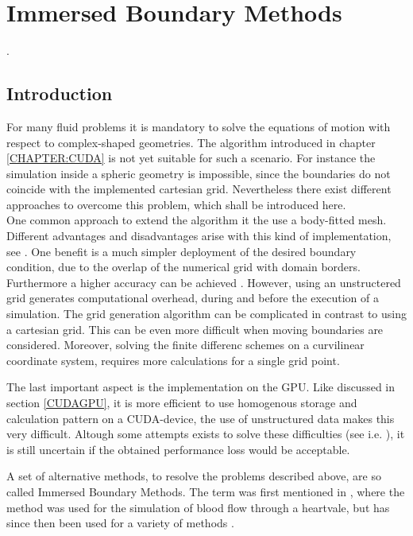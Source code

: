 \chapter{Immersed Boundary Methods}
\label{CHAPTER:IBM}.

\section{Introduction}

For many fluid problems it is mandatory to solve the equations of motion with respect to complex-shaped geometries.
The algorithm introduced in chapter \ref{CHAPTER:CUDA} is not yet suitable for such a scenario.
For instance the simulation inside a spheric geometry is impossible, since the boundaries
do not coincide with the implemented cartesian grid. Nevertheless there exist different approaches to overcome this problem,
which shall be introduced here. \\
One common approach to extend the algorithm it the use a body-fitted mesh.
Different advantages and disadvantages arise with this kind of implementation, see \citep{Mittal2005}.
One benefit is a much simpler deployment of the desired boundary condition, due to the overlap of the numerical grid with domain borders.
Furthermore a higher accuracy can be achieved \citep{Gornak2013}.
However, using an unstructered grid generates  computational overhead, during and before the execution of a simulation.
The grid generation algorithm can be complicated in contrast to using a cartesian grid. This can be even more difficult when
moving boundaries are considered.
Moreover, solving the finite differenc schemes on a curvilinear coordinate system, requires more calculations for a single grid point.

The last important aspect is the implementation on the GPU.
Like discussed in section \ref{CUDAGPU}, it is more efficient to use homogenous storage and calculation pattern on a CUDA-device,
the use of unstructured data makes this very difficult.
Altough some attempts exists to solve these difficulties (see i.e. \citep{PAP}), it is still uncertain if the obtained performance loss would be acceptable.

A set of alternative methods, to resolve the problems described above, are so called Immersed Boundary Methods.
The term was first mentioned in \citep{peskin72}, where the method was used for the simulation of blood flow through a heartvale,
but has since then been used for a variety of methods \citep{Mittal2005}.

